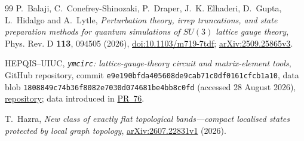 \documentclass[11pt]{article}
\theoremstyle{plain}
\theoremstyle{definition}
\theoremstyle{remark}
\begin{document}
\begin{thebibliography}{99}
 P.~Balaji, C.~Conefrey-Shinozaki, P.~Draper,
  J.~K. Elhaderi, D.~Gupta, L.~Hidalgo and A.~Lytle,
  \emph{Perturbation theory, irrep truncations, and state preparation methods
  for quantum simulations of $SU(3)$ lattice gauge theory}, Phys. Rev. D
  \textbf{113}, 094505 (2026),
  \href{https://doi.org/10.1103/m719-7tdf}{doi:10.1103/m719-7tdf};
  \href{https://arxiv.org/abs/2509.25865}{arXiv:2509.25865v3}.

 HEPQIS--UIUC,
  \emph{\texttt{ymcirc}: lattice-gauge-theory circuit and matrix-element
  tools}, GitHub repository, commit
  \nolinkurl{e9e190bfda405608de9cab71c0df0161cfcb1a10}, data blob
  \nolinkurl{1808849c74b36f8082e7030d074681be4bb8c0fd} (accessed 28 August
  2026), \href{https://github.com/hepqis-uiuc/ymcirc}{repository};
  data introduced in \href{https://github.com/hepqis-uiuc/ymcirc/pull/76}{PR~76}.

 T.~Hazra,
  \emph{New class of exactly flat topological bands---compact localised states
  protected by local graph topology},
  \href{https://arxiv.org/abs/2607.22831}{arXiv:2607.22831v1} (2026).

\end{thebibliography}
\end{document}
